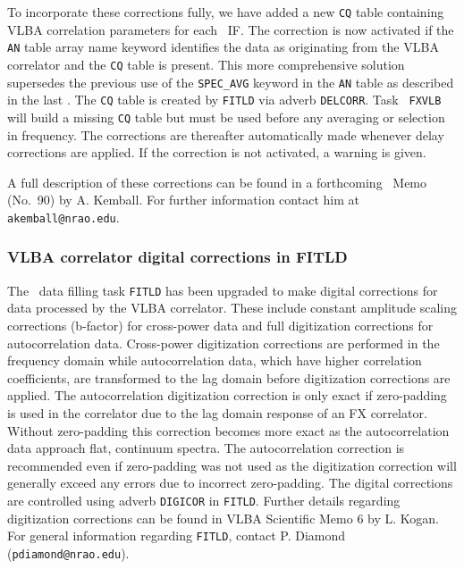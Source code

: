 To incorporate these corrections fully, we have added a new {\tt CQ}
table containing VLBA correlation parameters for each \AIPS\
\hbox{IF}. The correction is now activated if the {\tt AN} table array
name keyword identifies the data as originating from the VLBA
correlator and the {\tt CQ} table is present. This more comprehensive
solution supersedes the previous use of the {\tt SPEC\_AVG} keyword in
the {\tt AN} table as described in the last \Aipsletter.  The {\tt CQ}
table is created by {\tt FITLD} via adverb {\tt DELCORR}. Task {\tt
FXVLB} will build a missing {\tt CQ} table but must be used before any
averaging or selection in frequency. The corrections are thereafter
automatically made whenever delay corrections are applied. If the
correction is not activated, a warning is given.

A full description of these corrections can be found in a forthcoming
\AIPS\ Memo (No.~90) by A. Kemball.  For further information contact
him at {\tt akemball@nrao.edu}.

\vfill\eject

\subsubsection{VLBA correlator digital corrections in FITLD}

The \AIPS\ data filling task {\tt FITLD} has been upgraded to make
digital corrections for data processed by the VLBA correlator. These
include constant amplitude scaling corrections (b-factor) for
cross-power data and full digitization corrections for autocorrelation
data. Cross-power digitization corrections are performed in the
frequency domain while autocorrelation data, which have higher
correlation coefficients, are transformed to the lag domain before
digitization corrections are applied.  The autocorrelation
digitization correction is only exact if zero-padding is used in the
correlator due to the lag domain response of an FX correlator. Without
zero-padding this correction becomes more exact as the autocorrelation
data approach flat, continuum spectra. The autocorrelation correction
is recommended even if zero-padding was not used as the digitization
correction will generally exceed any errors due to incorrect
zero-padding. The digital corrections are controlled using adverb
{\tt DIGICOR} in \hbox{{\tt FITLD}}. Further details regarding
digitization corrections can be found in VLBA Scientific Memo 6 by L.
Kogan.  For general information regarding {\tt FITLD}, contact P.
Diamond ({\tt pdiamond@nrao.edu}).

